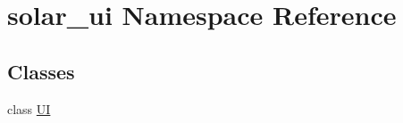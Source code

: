 \hypertarget{namespacesolar__ui}{}\section{solar\+\_\+ui Namespace Reference}
\label{namespacesolar__ui}
\subsection*{Classes}
\begin{DoxyCompactItemize}
\item 
class \hyperlink{classsolar__ui_1_1_u_i}{U\+I}
\end{DoxyCompactItemize}
